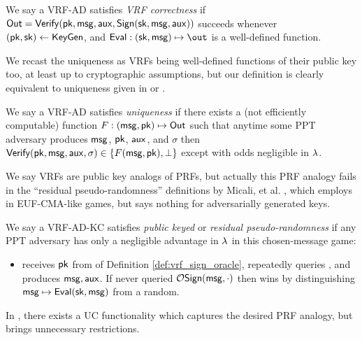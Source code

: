 \begin{definition}
We say a VRF-AD satisfies {\em VRF correctness} if
 ${\mathsf{Out}} = {\mathsf{Verify}}(\mathsf{pk},\mathsf{msg},\mathsf{aux},{\mathsf{Sign}}(\mathsf{sk},\mathsf{msg},\mathsf{aux}))$ succeeds
whenever $(\mathsf{pk},\mathsf{sk}) \leftarrow {\ensuremath{\mathsf{KeyGen}}}$, and
$\Eval : (\sk,\msg) \mapsto \out$ is a well-defined function.
\end{definition}

We recast the uniqueness as VRFs being well-defined functions of
their public key too, at least up to cryptographic assumptions,
but our definition is clearly equivalent to uniqueness given in
\cite[Def. 2 \S3.2, pp. 4]{vrf_micali} or \cite[Def. 3, pp. 8]{agg_dgk}.

\begin{definition}
We say a VRF-AD satisfies {\em uniqueness} if
there exists a (not efficiently computable) function
 $F : (\mathsf{msg},\mathsf{pk}) \mapsto {\ensuremath{\mathsf{Out}}}$ such that
anytime some PPT adversary \adv produces $\mathsf{msg}$, $\mathsf{pk}$, $\mathsf{aux}$, and $\sigma$
then ${\mathsf{Verify}}(\mathsf{pk},\mathsf{msg},\mathsf{aux},\sigma) \in \{ F(\mathsf{msg},\mathsf{pk}), \perp \}$
except with odds negligible in $\lambda$.
\end{definition}

We say VRFs are public key analogs of PRFs, but actually this PRF analogy
fails in the ``residual pseudo-randomness'' definitions by
Micali, et al. \cite[Def. VRF (3) \S3.2, pp. 4]{vrf_micali},
 which employs  in EUF-CMA-like games,
 but says nothing for adversarially generated keys.

\begin{definition}
We say a VRF-AD-KC satisfies {\em public keyed} or {\em residual pseudo-randomness} if 
any PPT adversary \adv has only a negligible advantage in $\lambda$
in this chosen-message game:
\begin{itemize}
	\item[]
	\adv receives $\mathsf{pk}$ from  of Definition \ref{def:vrf_sign_oracle},
	repeatedly queries , and produces $\mathsf{msg},\mathsf{aux}$.
	If \adv never queried $\mathcal{O}\mathsf{Sign}(\mathsf{msg},\cdot)$ then
	\adv wins by distinguishing $\mathsf{msg} \mapsto {\ensuremath{\mathsf{Eval}}}(\mathsf{sk},\mathsf{msg})$ from a random.
\end{itemize}
\end{definition}

In \cite{praos}, there exists a UC functionality which captures the
desired PRF analogy, but brings unnecessary restrictions.

